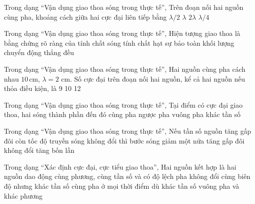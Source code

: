 \begin{ex}
Trong dạng “Vận dụng giao thoa sóng trong thực tế”, Trên đoạn nối hai nguồn cùng pha, khoảng cách giữa hai cực đại liên tiếp bằng
\choice
{\True $\lambda/2$}
{$\lambda$}
{$2\lambda$}
{$\lambda/4$}
\end{ex}

\begin{ex}
Trong dạng “Vận dụng giao thoa sóng trong thực tế”, Hiện tượng giao thoa là bằng chứng rõ ràng của
\choice
{\True tính chất sóng}
{tính chất hạt}
{sự bảo toàn khối lượng}
{chuyển động thẳng đều}
\end{ex}

\begin{ex}
Trong dạng “Vận dụng giao thoa sóng trong thực tế”, Hai nguồn cùng pha cách nhau $10\,\text{cm}$, $\lambda=2$ cm. Số cực đại trên đoạn nối hai nguồn, kể cả hai nguồn nếu thỏa điều kiện, là
\choice
{9}
{10}
{}
{12}
\end{ex}

\begin{ex}
Trong dạng “Vận dụng giao thoa sóng trong thực tế”, Tại điểm có cực đại giao thoa, hai sóng thành phần đến đó
\choice
{\True cùng pha}
{ngược pha}
{vuông pha}
{khác tần số}
\end{ex}

\begin{ex}
Trong dạng “Vận dụng giao thoa sóng trong thực tế”, Nếu tần số nguồn tăng gấp đôi còn tốc độ truyền sóng không đổi thì bước sóng
\choice
{\True giảm một nửa}
{tăng gấp đôi}
{không đổi}
{tăng bốn lần}
\end{ex}

\begin{ex}
Trong dạng “Xác định cực đại, cực tiểu giao thoa”, Hai nguồn kết hợp là hai nguồn dao động
\choice
{\True cùng phương, cùng tần số và có độ lệch pha không đổi}
{cùng biên độ nhưng khác tần số}
{cùng pha ở mọi thời điểm dù khác tần số}
{vuông pha và khác phương}
\end{ex}

